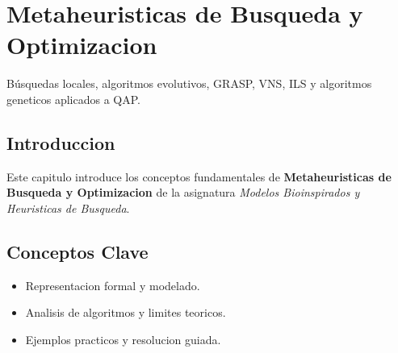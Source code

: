 \chapter{Metaheuristicas de Busqueda y Optimizacion}
\label{ch:metaheuristicas}

Búsquedas locales, algoritmos evolutivos, GRASP, VNS, ILS y algoritmos geneticos aplicados a QAP.

\section{Introduccion}
Este capitulo introduce los conceptos fundamentales de \textbf{Metaheuristicas de Busqueda y Optimizacion} de la asignatura \textit{Modelos Bioinspirados y Heuristicas de Busqueda}.

\section{Conceptos Clave}
\begin{itemize}
    \item Representacion formal y modelado.
    \item Analisis de algoritmos y limites teoricos.
    \item Ejemplos practicos y resolucion guiada.
\end{itemize}
